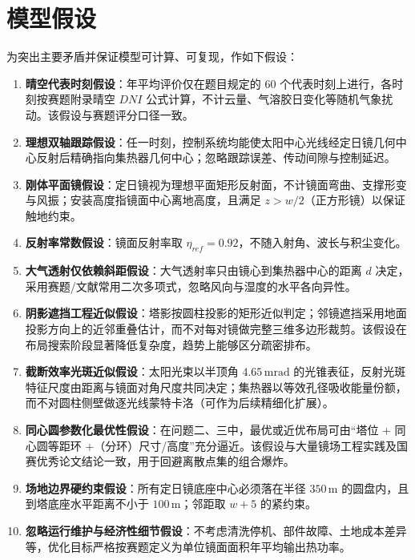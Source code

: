 \documentclass[withoutpreface,bwprint]{cumcmthesis}
\begin{document}
\section{模型假设}

为突出主要矛盾并保证模型可计算、可复现，作如下假设：
\begin{enumerate}[leftmargin=2em]
  \item \textbf{晴空代表时刻假设}：年平均评价仅在题目规定的 $60$ 个代表时刻上进行，各时刻按赛题附录晴空 $DNI$ 公式计算，不计云量、气溶胶日变化等随机气象扰动。该假设与赛题评分口径一致。
  \item \textbf{理想双轴跟踪假设}：任一时刻，控制系统均能使太阳中心光线经定日镜几何中心反射后精确指向集热器几何中心；忽略跟踪误差、传动间隙与控制延迟。
  \item \textbf{刚体平面镜假设}：定日镜视为理想平面矩形反射面，不计镜面弯曲、支撑形变与风振；安装高度指镜面中心离地高度，且满足 $z>w/2$（正方形镜）以保证触地约束。
  \item \textbf{反射率常数假设}：镜面反射率取 $\eta_{ref}=0.92$，不随入射角、波长与积尘变化。
  \item \textbf{大气透射仅依赖斜距假设}：大气透射率只由镜心到集热器中心的距离 $d$ 决定，采用赛题/文献常用二次多项式，忽略风向与湿度的水平各向异性。
  \item \textbf{阴影遮挡工程近似假设}：塔影按圆柱投影的矩形近似判定；邻镜遮挡采用地面投影方向上的近邻重叠估计，而不对每对镜做完整三维多边形裁剪。该假设在布局搜索阶段显著降低复杂度，趋势上能够区分疏密排布。
  \item \textbf{截断效率光斑近似假设}：太阳光束以半顶角 $4.65\,\mathrm{mrad}$ 的光锥表征，反射光斑特征尺度由距离与镜面对角尺度共同决定；集热器以等效孔径吸收能量份额，而不对圆柱侧壁做逐光线蒙特卡洛（可作为后续精细化扩展）。
  \item \textbf{同心圆参数化最优性假设}：在问题二、三中，最优或近优布局可由“塔位 + 同心圆等距环 +（分环）尺寸/高度”充分逼近。该假设与大量镜场工程实践及国赛优秀论文结论一致，用于回避离散点集的组合爆炸。
  \item \textbf{场地边界硬约束假设}：所有定日镜底座中心必须落在半径 $350\,\mathrm{m}$ 的圆盘内，且到塔底座水平距离不小于 $100\,\mathrm{m}$；邻距取 $w+5$ 的紧约束。
  \item \textbf{忽略运行维护与经济性细节假设}：不考虑清洗停机、部件故障、土地成本差异等，优化目标严格按赛题定义为单位镜面面积年平均输出热功率。
\end{enumerate}
\end{document}
